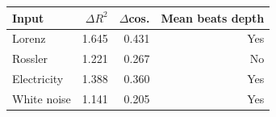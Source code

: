 \begin{tabular}{lrrr}
\toprule
Input & $\Delta R^2$ & $\Delta$cos. & Mean beats depth \\
\midrule
Lorenz & 1.645 & 0.431 & Yes \\
Rossler & 1.221 & 0.267 & No \\
Electricity & 1.388 & 0.360 & Yes \\
White noise & 1.141 & 0.205 & Yes \\
\bottomrule
\end{tabular}

